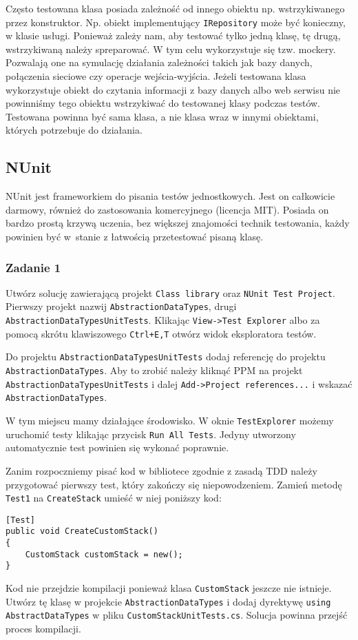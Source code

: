 Często testowana klasa posiada zależność od innego obiektu np. wstrzykiwanego przez konstruktor. Np. obiekt implementujący \texttt{IRepository} może być konieczny, w klasie usługi. Ponieważ zależy nam, aby testować tylko jedną klasę, tę drugą, wstrzykiwaną należy spreparować. W tym celu wykorzystuje się tzw. mockery. Pozwalają one na symulację działania zależności takich jak bazy danych, połączenia sieciowe czy operacje wejścia-wyjścia. Jeżeli testowana klasa wykorzystuje obiekt do czytania informacji z bazy danych albo web serwisu nie powinniśmy tego obiektu wstrzykiwać do testowanej klasy podczas testów. Testowana powinna być sama klasa, a nie klasa wraz w innymi obiektami, których potrzebuje do działania. 


\subsection{NUnit}
NUnit jest frameworkiem do pisania testów jednostkowych. Jest on całkowicie darmowy, również do zastosowania komercyjnego (licencja MIT). Posiada on bardzo prostą krzywą uczenia, bez większej znajomości technik testowania, każdy powinien być w~stanie z łatwością przetestować pisaną klasę.

\subsubsection{Zadanie 1}
Utwórz solucję zawierającą projekt \texttt{Class library} oraz \texttt{NUnit Test Project}. Pierwszy projekt nazwij \texttt{AbstractionDataTypes}, drugi \texttt{AbstractionDataTypesUnitTests}. Klikając \texttt{View->Test Explorer} albo za pomocą skrótu klawiszowego \texttt{Ctrl+E,T} otwórz widok eksploratora testów. 

Do projektu \texttt{AbstractionDataTypesUnitTests} dodaj referencję do projektu \texttt{AbstractionDataTypes}. Aby to zrobić należy kliknąć PPM na projekt \texttt{AbstractionDataTypesUnitTests} i dalej \texttt{Add->Project references...} i wskazać \texttt{AbstractionDataTypes}. 

W tym miejscu mamy działające środowisko. W oknie \texttt{TestExplorer} możemy uruchomić testy klikając przycisk \texttt{Run All Tests}. Jedyny utworzony automatycznie test powinien się wykonać poprawnie.

Zanim rozpoczniemy pisać kod w bibliotece zgodnie z zasadą TDD należy przygotować pierwszy test, który zakończy się niepowodzeniem. Zamień metodę \texttt{Test1} na \texttt{CreateStack} umieść w niej poniższy kod:
\begin{lstlisting}
[Test]
public void CreateCustomStack()
{
	CustomStack customStack = new();
}
\end{lstlisting}
Kod nie przejdzie kompilacji ponieważ klasa \texttt{CustomStack} jeszcze nie istnieje. Utwórz tę klasę w projekcie \texttt{AbstractionDataTypes} i dodaj dyrektywę \texttt{using AbstractDataTypes} w pliku \texttt{CustomStackUnitTests.cs}. Solucja powinna przejść proces kompilacji.

